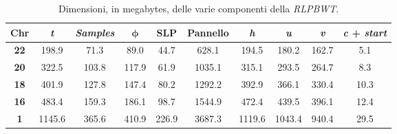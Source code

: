 \begin{table}
  \centering
  \caption{Dimensioni, in megabytes, delle varie componenti della
    \textit{RLPBWT}.} 
  \label{tab:comp}
  \scriptsize
  \begin{tabular}{c||c|c|c|c|c|c|c|c|c}
    \textbf{Chr}  & \textbf{\textit{t}} & \textit{\textbf{Samples}} & $\boldsymbol\phi$ &
                                                                                 \textbf{SLP}
    & \textbf{Pannello} & \textbf{\textit{h}} &  \textbf{\textit{u}}  &
                                                                        \textbf{\textit{v}}
    &  \textbf{\textit{c}} +  \textbf{\textit{start}}\\ \hline    \hline
    \textbf{22}  & 198.9 & 71.3 & 89.0 & 44.7 & 628.1 & 194.5 & 180.2 & 162.7 & 5.1
    \\ \hline
    \textbf{20}  & 322.5 & 103.8 & 117.9 & 61.9 & 1035.1 & 315.1 &  293.5 & 264.7 & 8.3
    \\ \hline
    \textbf{18}  & 401.9 & 127.8 & 147.4 & 80.2 & 1292.2 & 392.9 & 366.1 & 330.4 & 10.3
    \\ \hline
    \textbf{16}  & 483.4 & 159.3 & 186.1 & 98.7 & 1544.9 & 472.4 & 439.5 & 396.1 & 12.4
    \\ \hline
    \textbf{1}  & 1145.6 & 365.6 & 410.9& 226.9 & 3687.3 & 1119.6 & 1043.4 & 940.4 & 29.5
    \\ 
  \end{tabular}
\end{table}
